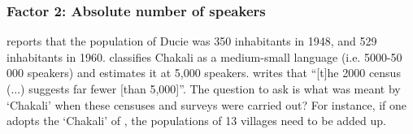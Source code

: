 \clearpage


\subsubsection{Factor 2:  Absolute number of speakers}
\label{sec:SOC-Factor2}

 
 \citet[17]{Wilk89} reports that the
population of  Ducie was 350 inhabitants in 1948,  and 529 inhabitants in 1960. 
\citet[144]{Nade89} classifies Chakali as a medium-small language (i.e. 5000-50
000 speakers) 
and
\cite{Tomp02}
estimates it at  5,000 speakers. \cite{Daku05} writes that ``[t]he 2000 census
(...) suggests far fewer [than 5,000]''.  The
question to ask is what was meant by `Chakali' when these censuses and surveys
were
carried out?  For instance, if one adopts the `Chakali' of \cite{Daan94},  the
populations
of  13 villages need to be added up.  




